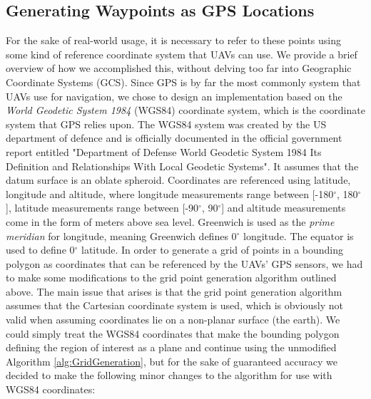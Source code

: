 



\subsection{Generating Waypoints as GPS Locations}
For the sake of real-world usage, it is necessary to refer to these points using some kind of reference coordinate system that UAVs can use. We provide a brief overview of how we accomplished this, without delving too far into Geographic Coordinate Systems (GCS). Since GPS is by far the most commonly system that UAVs use for navigation, we chose to design an implementation based on the \textit{World Geodetic System 1984} (WGS84) coordinate system, which is the coordinate system that GPS relies upon. The WGS84 system was created by the US department of defence and is officially documented in the official government report entitled "Department of Defense World Geodetic System 1984 Its Definition and Relationships With Local Geodetic Systems". It assumes that the datum surface is an oblate spheroid.
Coordinates are referenced using latitude, longitude and altitude, where longitude measurements range between [-180$^{\circ}$, 180$^{\circ}$], latitude measurements range between [-90$^{\circ}$, 90$^{\circ}$] and altitude measurements come in the form of meters above sea level. Greenwich is used as the \textit{prime meridian} for longitude, meaning Greenwich defines 0$^{\circ}$ longitude. The equator is used to define 0$^{\circ}$ latitude. In order to generate a grid of points in a bounding polygon as coordinates that can be referenced by the UAVs' GPS sensors, we had to make some modifications to the grid point generation algorithm outlined above. The main issue that arises is that the grid point generation algorithm assumes that the Cartesian coordinate system is used, which is obviously not valid when assuming coordinates lie on a  non-planar surface (the earth). We could simply treat the WGS84 coordinates that make the bounding polygon defining the region of interest as a plane and continue using the unmodified Algorithm \ref{alg:GridGeneration}, but for the sake of guaranteed accuracy we decided to make the following minor changes to the algorithm for use with WGS84 coordinates:
